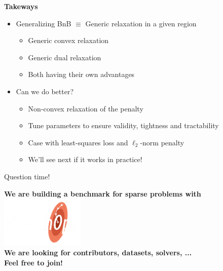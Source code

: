 \documentclass[10pt]{beamer}
\begin{document}
\begin{frame}

  \begin{center}
    \Large{\textbf{Takeways}}
  \end{center}
  \begin{itemize}
    \item Generalizing BnB $\equiv$ Generic \textcolor{TolLightRed}{relaxation} in a given region
    \begin{itemize}
      \item Generic \textcolor{mLightGreen}{convex} relaxation
      \item Generic \textcolor{mLightBlue}{dual} relaxation
      \item Both having their own advantages
    \end{itemize}
    \item Can we do better?
    \begin{itemize}
      \item \textcolor{mLightBrown}{Non-convex} relaxation of the penalty
      \item Tune parameters to ensure validity, tightness and tractability
      \item Case with least-squares loss and $\ell_2$-norm penalty
      \item We'll see next if it works in practice!
    \end{itemize}
  \end{itemize}
\end{frame}

\begin{frame}[standout]

  \vspace*{2cm}
  Question time!
  \vspace*{1.5cm}

  \begin{center}
    \normalsize
    \textbf{We are building a benchmark for sparse problems with} \\
    \includegraphics[width=0.3\textwidth]{img/logo_benchopt_white.png} \\
    \textbf{We are looking for contributors, datasets, solvers, ...} \\
    \textbf{Feel free to join!}
  \end{center}
\end{frame}
\end{document}
